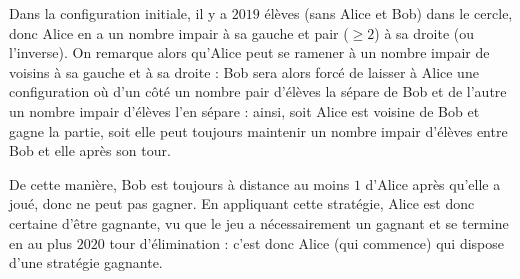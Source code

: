 
Dans la configuration initiale, il y a $2019$ élèves (sans Alice et Bob) dans le cercle, donc Alice en a un nombre impair à sa gauche et pair ($\ge2$) à sa droite (ou l'inverse). On remarque alors qu'Alice peut se ramener à un nombre impair de voisins à sa gauche et à sa droite : Bob sera alors forcé de laisser à Alice une configuration où d'un côté un nombre pair d'élèves la sépare de Bob et de l'autre un nombre impair d'élèves l'en sépare : ainsi, soit Alice est voisine de Bob et gagne la partie, soit elle peut toujours maintenir un nombre impair d'élèves entre Bob et elle après son tour.

De cette manière, Bob est toujours à distance au moins $1$ d'Alice après qu'elle a joué, donc ne peut pas gagner. En appliquant cette stratégie, Alice est donc certaine d'être gagnante, vu que le jeu a nécessairement un gagnant et se termine en au plus $2020$ tour d'élimination : c'est donc Alice (qui commence) qui dispose d'une stratégie gagnante.